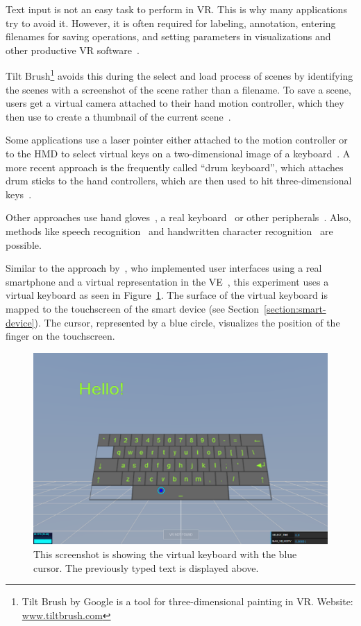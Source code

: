 Text input is not an easy task to perform in \gls{VR}. This is why many applications try to avoid it. However, it is often required for labeling, annotation, entering filenames for saving operations, and setting parameters in visualizations and other productive \gls{VR} software~\cite[2154]{Rhoton.2002}. 

Tilt Brush\footnote{Tilt Brush by Google is a tool for three-dimensional painting in VR. Website: \href{https://www.tiltbrush.com/}{www.tiltbrush.com}} avoids this during the select and load process of scenes by identifying the scenes with a screenshot of the scene rather than a filename. To save a scene, users get a virtual camera attached to their hand motion controller, which they then use to create a thumbnail of the current scene~\cite{GoogleLLC.2019}. %

Some applications use a laser pointer either attached to the motion controller or to the \gls{HMD} to select virtual keys on a two-dimensional image of a keyboard~\cite{WeelcoInc.2017}. A more recent approach is the frequently called \enquote{drum keyboard}, which attaches drum sticks to the hand controllers, which are then used to hit three-dimensional keys~\cite{Weisel.2017}.

Other approaches use hand gloves~\cite{Evans.1999,Rhoton.2002}, a real keyboard~\cite{McGill.2015,Walker.2017} or other peripherals~\cite[111\psq]{Gonzalez.2009}. Also, methods like speech recognition~\cite[2154\psqq]{Rhoton.2002} and handwritten character recognition~\cite[113]{Gonzalez.2009} are possible.

Similar to the approach by~\citeauthor{Dias.2018}, who implemented user interfaces using a real smartphone and a virtual representation in the \gls{VE}~\cite[5]{Dias.2018}, this experiment uses a virtual keyboard as seen in Figure~\ref{fig:screenshot-exp-vk}.
The surface of the virtual keyboard is mapped to the touchscreen of the smart device (see Section~\ref{section:smart-device}). The cursor, represented by a blue circle, visualizes the position of the finger on the touchscreen.

\begin{figure}[H]
	\centering
	\includegraphics[width=12cm]{figures/implementation/screenshot_exp_vk.png}
	\caption[Screenshot of the virtual keyboard]{This screenshot is showing the virtual keyboard with the blue cursor. The previously typed text is displayed above.}\label{fig:screenshot-exp-vk}
\end{figure}

